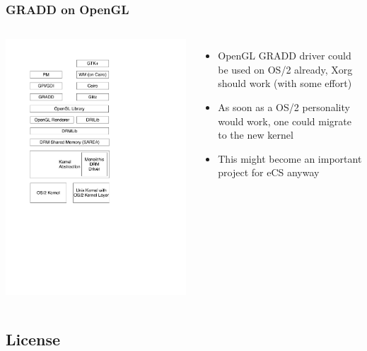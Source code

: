 \documentclass{beamer}
\begin{document}
\begin{frame}
\frametitle{GRADD on OpenGL}
\begin{columns}
\column{3cm}
\includegraphics[scale=0.3]{ogl-gradd.pdf}
\column{6cm}
\begin{itemize}[<+->]
  \item OpenGL GRADD driver could be  used on OS/2 already, Xorg should work (with some effort)
  \item As soon as a OS/2 personality would work, one could migrate to the new
  kernel 
  \item This might become an important project for eCS anyway
\end{itemize}
\end{columns}
\end{frame}

\subsection{License}
\end{document}

